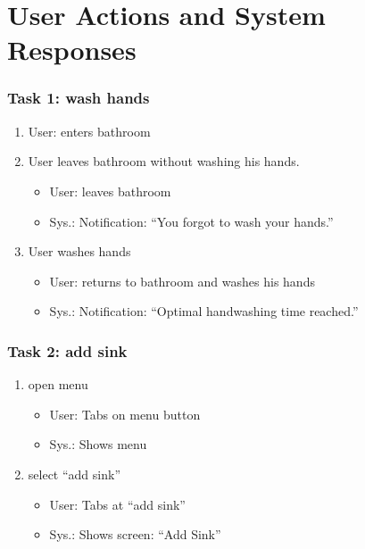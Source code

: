 \documentclass{beamer}
\begin{document}
\section{User Actions and System Responses}
\begin{frame}
  \frametitle{Task 1: wash hands}
  \begin{enumerate}
  \item User: enters bathroom

  \item  User leaves bathroom without washing his hands.
    \begin{itemize}
    \item User: leaves bathroom
    \item Sys.: Notification: ``You forgot to wash your hands.''
    \end{itemize}

  \item  User washes hands
    \begin{itemize}
    \item User: returns to bathroom and washes his hands
    \item Sys.: Notification: ``Optimal handwashing time reached.''
    \end{itemize}
  \end{enumerate}          
\end{frame}

\begin{frame}
  \frametitle{Task 2: add sink}
  \begin{enumerate}
  \item	open menu
    \begin{itemize}
    \item User: Tabs on menu button
    \item Sys.: Shows menu
    \end{itemize}
    
  \item	select ``add sink''
    \begin{itemize}         
    \item User: Tabs at ``add sink''
    \item Sys.: Shows screen: ``Add Sink''
    \end{itemize}
  \end{enumerate}          
\end{frame}
\end{document}
